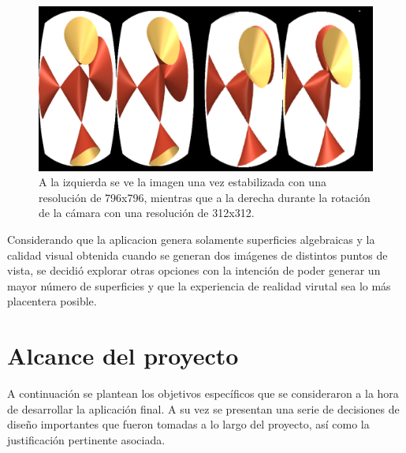 \documentclass[12pt]{article}
\begin{document}
\clearpage
\begin{figure}[h!]
\includegraphics[width=\textwidth]{se_puede_doble.png}
\caption{A la izquierda se ve la imagen una vez estabilizada con una resolución de 796x796, mientras que a la derecha durante la rotación de la cámara con una resolución de 312x312.}
\end{figure}
Considerando que la aplicacion genera solamente superficies algebraicas y la calidad visual obtenida cuando se generan dos imágenes de distintos puntos de vista, se decidió explorar otras opciones con la intención de poder generar un mayor número de superficies y que la experiencia de realidad virutal sea lo más placentera posible.
\clearpage
\section{Alcance del proyecto}
A continuación se plantean los objetivos específicos que se consideraron a la hora de desarrollar la aplicación final. A su vez se presentan una serie de decisiones de diseño importantes que fueron tomadas a lo largo del proyecto, así como la justificación pertinente asociada.
\end{document}
